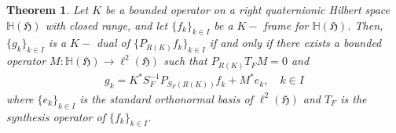 \documentclass[a4paper,12pt,reqno]{amsart}
\theoremstyle{plain}
\newtheorem{theorem}{\bf Theorem}[section]
\theoremstyle{remark}
\begin{document}
	\begin{theorem}
		Let $K$ be a bounded operator on a right quaternionic Hilbert space $\mathbb{H}(\mathfrak{H})$ with closed range, and let $\{f_k\}_{k\in I}$ be a $K-$ frame for $\mathbb{H}(\mathfrak{H})$. Then, $\{g_k\}_{k \in I}$ is a $K-$ dual of $\{P_{R(K)}f_k\}_{k\in I}$ if and only if there exists a bounded operator $M: \mathbb{H}(\mathfrak{H}) \to \ell ^2(\mathfrak{H})$ such that $P_{R(K)}T_FM=0$ and
		\begin{align*}
			g_k= K^* S_F^{-1}P_{S_F(R(K))}f_k + M^*e_k, \quad k \in I
		\end{align*}
		where $\{e_k\}_{k \in I}$ is the standard orthonormal basis of $\ell ^2(\mathfrak{H})$ and $T_F$ is the synthesis operator of $\{f_k\}_{k\in I}$.
	\end{theorem}
	
\end{document}
